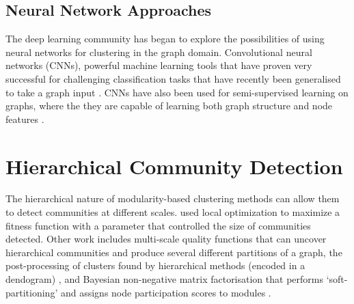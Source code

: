 \documentclass{article}
\begin{document}
\subsection{Neural Network Approaches}
The deep learning community has began to explore the possibilities of using neural networks for clustering in the graph domain. Convolutional neural networks (CNNs), powerful machine learning tools that have proven very successful for challenging classification tasks that have recently been generalised to take a graph input \cite{defferrard2016convolutional}. 
CNNs have also been used for semi-supervised learning on graphs, where the they are capable of learning both graph structure and node features \cite{kipf2016semi}. 

\section{Hierarchical Community Detection}

The hierarchical nature of modularity-based clustering methods can allow them to detect communities at different scales. 
\cite{lancichinetti2009detecting} used local optimization to maximize a fitness function with a parameter that controlled the size of communities detected.
Other work includes multi-scale quality functions that can uncover hierarchical communities and produce several different partitions of a graph, the post-processing of clusters found by hierarchical methods (encoded in a dendogram) \cite{pons2011post}, and Bayesian non-negative matrix factorisation that performs `soft-partitioning' and assigns node participation scores to modules \cite{psorakis2011overlapping}.
\end{document}
